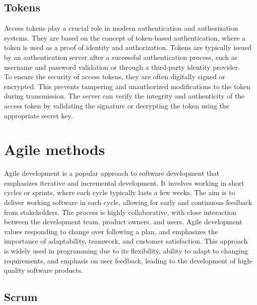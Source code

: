 \subsection{Tokens}
\label{sec:tokens}

Access tokens play a crucial role in modern authentication and authorization systems. They are based on the concept of token-based authentication, where a token is used as a proof of identity and authorization. \cite{Okta_tokens} Tokens are typically issued by an authentication server after a successful authentication process, such as username and password validation or through a third-party identity provider. \\

\noindent
To ensure the security of access tokens, they are often digitally signed or encrypted. This prevents tampering and unauthorized modifications to the token during transmission. The server can verify the integrity and authenticity of the access token by validating the signature or decrypting the token using the appropriate secret key. \\

\section{Agile methods}

Agile development is a popular approach to software development that emphasizes iterative and incremental development. It involves working in short cycles or sprints, where each cycle typically lasts a few weeks. The aim is to deliver working software in each cycle, allowing for early and continuous feedback from stakeholders. The process is highly collaborative, with close interaction between the development team, product owners, and users. Agile development values responding to change over following a plan, and emphasizes the importance of adaptability, teamwork, and customer satisfaction. \cite{AgileAlliance_agile101} This approach is widely used in programming due to its flexibility, ability to adapt to changing requirements, and emphasis on user feedback, leading to the development of high-quality software products.

\subsection{Scrum}

